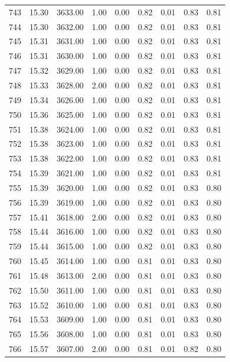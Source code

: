 \documentclass{article}\usepackage[]{graphicx}\usepackage[]{color}
\begin{document}
\begin{longtable}{rrrrrrrrr}
  743 & 15.30 & 3633.00 & 1.00 & 0.00 & 0.82 & 0.01 & 0.83 & 0.81 \\ 
  744 & 15.30 & 3632.00 & 1.00 & 0.00 & 0.82 & 0.01 & 0.83 & 0.81 \\ 
  745 & 15.31 & 3631.00 & 1.00 & 0.00 & 0.82 & 0.01 & 0.83 & 0.81 \\ 
  746 & 15.31 & 3630.00 & 1.00 & 0.00 & 0.82 & 0.01 & 0.83 & 0.81 \\ 
  747 & 15.32 & 3629.00 & 1.00 & 0.00 & 0.82 & 0.01 & 0.83 & 0.81 \\ 
  748 & 15.33 & 3628.00 & 2.00 & 0.00 & 0.82 & 0.01 & 0.83 & 0.81 \\ 
  749 & 15.34 & 3626.00 & 1.00 & 0.00 & 0.82 & 0.01 & 0.83 & 0.81 \\ 
  750 & 15.36 & 3625.00 & 1.00 & 0.00 & 0.82 & 0.01 & 0.83 & 0.81 \\ 
  751 & 15.38 & 3624.00 & 1.00 & 0.00 & 0.82 & 0.01 & 0.83 & 0.81 \\ 
  752 & 15.38 & 3623.00 & 1.00 & 0.00 & 0.82 & 0.01 & 0.83 & 0.81 \\ 
  753 & 15.38 & 3622.00 & 1.00 & 0.00 & 0.82 & 0.01 & 0.83 & 0.81 \\ 
  754 & 15.39 & 3621.00 & 1.00 & 0.00 & 0.82 & 0.01 & 0.83 & 0.81 \\ 
  755 & 15.39 & 3620.00 & 1.00 & 0.00 & 0.82 & 0.01 & 0.83 & 0.80 \\ 
  756 & 15.39 & 3619.00 & 1.00 & 0.00 & 0.82 & 0.01 & 0.83 & 0.80 \\ 
  757 & 15.41 & 3618.00 & 2.00 & 0.00 & 0.82 & 0.01 & 0.83 & 0.80 \\ 
  758 & 15.44 & 3616.00 & 1.00 & 0.00 & 0.82 & 0.01 & 0.83 & 0.80 \\ 
  759 & 15.44 & 3615.00 & 1.00 & 0.00 & 0.82 & 0.01 & 0.83 & 0.80 \\ 
  760 & 15.45 & 3614.00 & 1.00 & 0.00 & 0.81 & 0.01 & 0.83 & 0.80 \\ 
  761 & 15.48 & 3613.00 & 2.00 & 0.00 & 0.81 & 0.01 & 0.83 & 0.80 \\ 
  762 & 15.50 & 3611.00 & 1.00 & 0.00 & 0.81 & 0.01 & 0.83 & 0.80 \\ 
  763 & 15.52 & 3610.00 & 1.00 & 0.00 & 0.81 & 0.01 & 0.83 & 0.80 \\ 
  764 & 15.53 & 3609.00 & 1.00 & 0.00 & 0.81 & 0.01 & 0.83 & 0.80 \\ 
  765 & 15.56 & 3608.00 & 1.00 & 0.00 & 0.81 & 0.01 & 0.83 & 0.80 \\ 
  766 & 15.57 & 3607.00 & 2.00 & 0.00 & 0.81 & 0.01 & 0.82 & 0.80 \\ 

\end{longtable}
\end{document}

